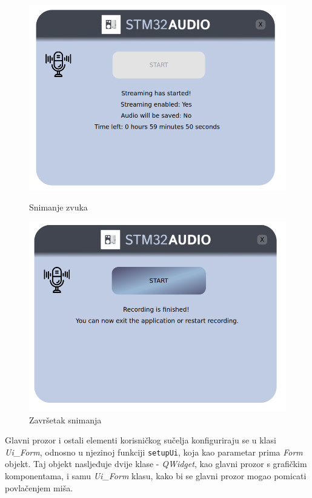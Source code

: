 \begin{figure}[ht]
	\begin{minipage}[t]{0.4\textwidth}
	\includegraphics[width=\linewidth]{imgs/recording_form_3}
	\caption{Snimanje zvuka}
	\label{fig:recording_form_3}
	\end{minipage}
	\hspace*{\fill}
	\begin{minipage}[t]{0.4\textwidth}
		\includegraphics[width=\linewidth]{imgs/recording_form_4}
		\caption{Završetak snimanja}
		\label{fig:recording_form_4}
	\end{minipage}
\end{figure}


Glavni prozor i ostali elementi korisničkog sučelja konfiguriraju se u klasi \textit{Ui\_Form}, odnosno u njezinoj funkciji \lstinline|setupUi|, koja kao parametar prima \textit{Form} objekt. Taj objekt nasljeđuje dvije klase - \textit{QWidget}, kao glavni prozor s grafičkim komponentama, i samu \textit{Ui\_Form} klasu, kako bi se glavni prozor mogao pomicati povlačenjem miša. 

